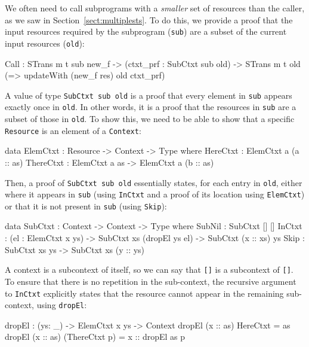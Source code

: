 \label{sect:callimpl}

We often need to call subprograms with a \emph{smaller} set of resources
than the caller, as we saw in Section~\ref{sect:multiplests}. 
To do this, we provide a proof that the input resources required by the
subprogram (\texttt{sub}) are a subset of the current input resources
(\texttt{old}):

\small
\begin{code}
Call : STrans m t sub new_f -> (ctxt_prf : SubCtxt sub old) ->
       STrans m t old (\res => updateWith (new_f res) old ctxt_prf)
\end{code}
\normalsize

A value of type \texttt{SubCtxt sub old} is a proof that every element
in \texttt{sub} appears exactly once in \texttt{old}. In other words, it is
a proof that the resources in \texttt{sub} are a subset of those in \texttt{old}.
To show this, we need to be able to show that a specific \texttt{Resource} is
an element of a \texttt{Context}:

\small
\begin{code}
data ElemCtxt : Resource -> Context -> Type where
     HereCtxt : ElemCtxt a (a :: as)
     ThereCtxt : ElemCtxt a as -> ElemCtxt a (b :: as)
\end{code}
\normalsize

Then, a proof of \texttt{SubCtxt sub old} 
essentially states, for each entry in \texttt{old},
either where it appears in \texttt{sub} (using \texttt{InCtxt} and a 
proof of its location using \texttt{ElemCtxt}) or that it is not present in
\texttt{sub} (using \texttt{Skip}):

\small
\begin{code}
data SubCtxt : Context -> Context -> Type where
     SubNil : SubCtxt [] []
     InCtxt : (el : ElemCtxt x ys) -> SubCtxt xs (dropEl ys el) ->
              SubCtxt (x :: xs) ys
     Skip : SubCtxt xs ys -> SubCtxt xs (y :: ys)
\end{code}
\normalsize

A context is a subcontext of itself, so we can say that \texttt{[]} is
a subcontext of \texttt{[]}.
To ensure that there is no repetition in the sub-context, the recursive
argument to \texttt{InCtxt} explicitly states that the resource cannot
appear in the remaining sub-context, using \texttt{dropEl}:

\small
\begin{code}
dropEl : (ys: _) -> ElemCtxt x ys -> Context
dropEl (x :: as) HereCtxt = as
dropEl (x :: as) (ThereCtxt p) = x :: dropEl as p
\end{code}
\normalsize

